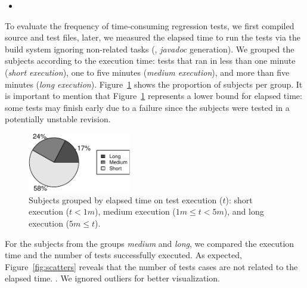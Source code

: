 \begin{itemize}
    \item \RQA
\end{itemize}

To evaluate the frequency of time-consuming regression tests, we first
compiled source and test files, later, we measured the elapsed time to
run the tests via the build system ignoring non-related tasks (\eg,
\emph{javadoc} generation).  We grouped the subjects according to the
execution time: tests that ran in less than one minute (\emph{short
execution}), one to five minutes (\emph{medium execution}), and more
than five minutes (\emph{long execution}).
Figure~\ref{fig:piechart-time} shows the proportion of subjects per
group. It is important to mention that Figure~\ref{fig:piechart-time}
represents a lower bound for elapsed time: some tests may finish early
due to a failure since the subjects were tested in a potentially
unstable revision.

\begin{figure}[h!]
    \centering
    \includegraphics[width=0.4\textwidth]{results/rq1/plots/piechart.pdf}
    \caption{\label{fig:piechart-time} Subjects grouped by elapsed
    time on test execution ($t$): short execution ($t < 1m$), medium 
    execution ($1m \leq t < 5m$), and long execution ($5m \leq t$).}
\end{figure}

For the subjects from the groups \emph{medium} and \emph{long}, we
compared the execution time and the number of tests successfully
executed. As expected, Figure~\ref{fig:scatters} reveals that the
number of tests cases are not related to the elapsed time.
.
We ignored outliers for better visualization.

